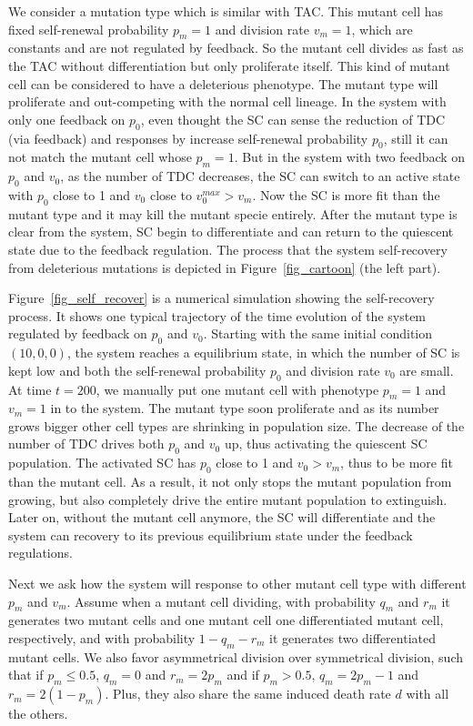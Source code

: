 \documentclass[12pt]{article}
\begin{document}
We consider a mutation type which is similar with TAC.
This mutant cell has fixed self-renewal probability $p_m=1$ and 
division rate $v_m=1$, which are constants and
are not regulated by feedback. So the mutant 
cell divides as fast as the TAC without differentiation but only proliferate
itself. This kind of mutant cell can be considered to have
a deleterious phenotype. The mutant
type will proliferate and out-competing with the normal cell lineage. 
In the system with only one feedback on $p_0$, even thought the SC
can sense the reduction of TDC (via feedback) and responses by increase
self-renewal probability $p_0$, still it can not match the mutant cell
whose $p_m=1$. But in the system with two feedback on $p_0$ and $v_0$,
as the number of TDC decreases, the SC can switch to an active state
with $p_0$ close to 1 and $v_0$ close to $v_0^{max} > v_m$. Now the SC
is more fit than the mutant type and it may kill the mutant specie entirely.
After the mutant type is clear from the system, SC begin to differentiate
and can return to the quiescent state due to the feedback regulation.
The process that the system self-recovery from deleterious mutations
is depicted in Figure~\ref{fig_cartoon} (the left part). 

Figure~\ref{fig_self_recover} is a numerical simulation showing the 
self-recovery process. It shows one typical trajectory of the time 
evolution of the system regulated by feedback on $p_0$ and $v_0$.
Starting with the same initial condition $(10, 0, 0)$,
  the system reaches a equilibrium state, in which the number of SC
is kept low and both the self-renewal probability $p_0$ and 
division rate $v_0$ are small. At time $t=200$, we manually put
one mutant cell with phenotype $p_m=1$ and $v_m=1$ in to the system.
The mutant type soon proliferate and as its number grows bigger other
cell types are shrinking in population size. The decrease of the number
of TDC drives both $p_0$ and $v_0$ up, thus activating the quiescent 
SC population. The activated SC has $p_0$ close to 1 and $v_0>v_m$, thus
to be more fit than the mutant cell. As a result, it not only stops the 
mutant population from growing, but also completely drive the entire 
mutant population to extinguish. Later on, without the mutant cell anymore,
the SC will differentiate and the system can recovery to its previous
equilibrium state under the feedback regulations.
 
Next we ask how the system will response to
other mutant cell type with different $p_m$ and $v_m$.
Assume when a mutant cell dividing, 
with probability $q_m$ and $r_m$ it generates two mutant cells and
one mutant cell one differentiated mutant cell, respectively, and
with probability $1-q_m-r_m$ it generates two differentiated mutant cells.
We also favor asymmetrical division over symmetrical division, such that
if $p_m \le 0.5$, $q_m=0$ and $r_m = 2p_m$ and if 
$p_m>0.5$, $q_m = 2p_m - 1$ and $r_m = 2(1-p_m)$.
Plus, they also share the same induced death rate $d$ with all the others.
\end{document}
